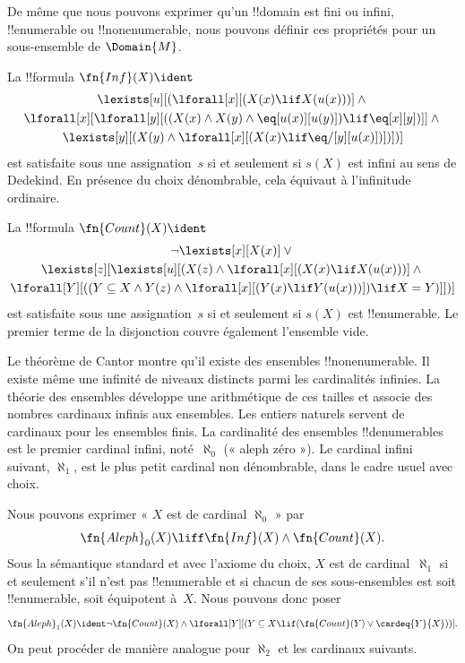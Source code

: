 \documentclass[../../../include/open-logic-section]{subfiles}
\begin{document}


\begin{explain}
De même que nous pouvons exprimer qu'un
!!{domain} est fini ou infini, !!{enumerable}
ou !!{nonenumerable}, nous pouvons définir
ces propriétés pour un sous-ensemble de
$\Domain{M}$.
\end{explain}

\begin{prop}
La !!{formula} $\fn{Inf}(X)\ident$
\begin{multline*}
\lexists[u][(\lforall[x][(X(x)\lif X(u(x)))]\land{}\\
\lforall[x][\lforall[y][((X(x)\land X(y)\land
\eq[u(x)][u(y)])\lif\eq[x][y])]]\land{}\\
\lexists[y][(X(y)\land\lforall[x][(X(x)
\lif\eq/[y][u(x)])])])]
\end{multline*}
est satisfaite sous une assignation~$s$ si et
seulement si $s(X)$ est infini au sens de
Dedekind. En présence du choix dénombrable,
cela équivaut à l'infinitude ordinaire.
\end{prop}

\begin{prop}
La !!{formula} $\fn{Count}(X)\ident$
\begin{multline*}
\lnot\lexists[x][X(x)]\lor{}\\
\lexists[z][\lexists[u][(X(z)\land
\lforall[x][(X(x)\lif X(u(x)))]\land{}\\
\lforall[Y][((Y\subseteq X\land Y(z)\land
\lforall[x][(Y(x)\lif Y(u(x)))])\lif X=Y)]])]
\end{multline*}
est satisfaite sous une assignation~$s$ si et
seulement si $s(X)$ est !!{enumerable}.
Le premier terme de la disjonction couvre
également l'ensemble vide.
\end{prop}

Le théorème de Cantor montre qu'il existe des
ensembles !!{nonenumerable}. Il existe même
une infinité de niveaux distincts parmi les
cardinalités infinies. La théorie des ensembles
développe une arithmétique de ces tailles et
associe des nombres cardinaux infinis aux
ensembles. Les entiers naturels servent de
cardinaux pour les ensembles finis.
La cardinalité des ensembles !!{denumerable}s
est le premier cardinal infini, noté~$\aleph_0$
(« aleph zéro »). Le cardinal infini suivant,
$\aleph_1$, est le plus petit cardinal non
dénombrable, dans le cadre usuel avec choix.

Nous pouvons exprimer « $X$ est de cardinal
$\aleph_0$ » par
\[
\fn{Aleph}_0(X)\liff
\fn{Inf}(X)\land\fn{Count}(X).
\]
Sous la sémantique standard et avec l'axiome
du choix, $X$ est de cardinal~$\aleph_1$ si
et seulement s'il n'est pas !!{enumerable}
et si chacun de ses sous-ensembles est soit
!!{enumerable}, soit équipotent à~$X$.
Nous pouvons donc poser
\[
\fn{Aleph}_1(X)\ident
\lnot\fn{Count}(X)\land
\lforall[Y][(Y\subseteq X\lif
(\fn{Count}(Y)\lor\cardeq{Y}{X}))].
\]
On peut procéder de manière analogue pour
$\aleph_2$ et les cardinaux suivants.
\end{document}
